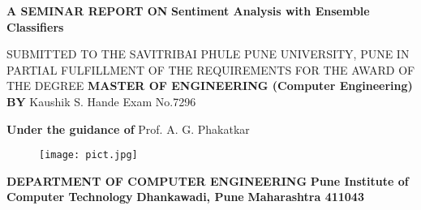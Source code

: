 \documentclass[10pt]{article}
\begin{document}
\begin{titlepage}
\begin{center}

 

\textbf {\large A SEMINAR REPORT ON}
\linebreak 
\linebreak 
\textbf {\Large{Sentiment Analysis with Ensemble Classifiers}}
\linebreak
\linebreak
\linebreak 

SUBMITTED TO THE SAVITRIBAI PHULE PUNE UNIVERSITY, PUNE 
\linebreak 
IN PARTIAL FULFILLMENT OF THE REQUIREMENTS 
\linebreak 
FOR THE AWARD OF THE DEGREE
\linebreak
\linebreak 
\textbf{\large{MASTER OF ENGINEERING (Computer Engineering)}}
\linebreak
\linebreak
\linebreak 
\textbf{\large{BY}}
\linebreak
\linebreak
 Kaushik S. Hande \hspace{20mm}   Exam No.7296
\linebreak
\linebreak
\linebreak 

\textbf{\large{Under the guidance of}}
\linebreak
Prof. A. G. Phakatkar
\linebreak
\linebreak 

\begin{figure}[ht!]
\begin{center}
\texttt{[image: pict.jpg]}
\end{center}
\label{overflow}
\end{figure}
\textbf{\linebreak \linebreak  \large{DEPARTMENT OF COMPUTER ENGINEERING}}
\linebreak
\linebreak
\textbf{Pune Institute of Computer Technology}
\linebreak
\textbf{Dhankawadi, Pune}
\linebreak
\textbf{Maharashtra 411043}
\linebreak
\end{center}
\end{titlepage}
\pagebreak
\end{document}
